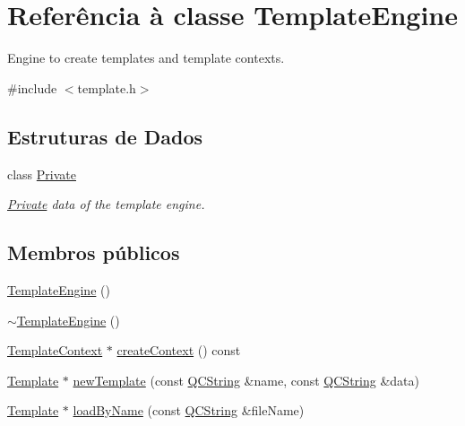 \hypertarget{class_template_engine}{\section{Referência à classe Template\-Engine}
\label{class_template_engine}
}


Engine to create templates and template contexts.  




{\ttfamily \#include $<$template.\-h$>$}

\subsection*{Estruturas de Dados}
\begin{DoxyCompactItemize}
\item 
class \hyperlink{class_template_engine_1_1_private}{Private}
\begin{DoxyCompactList}\small\item\em \hyperlink{class_template_engine_1_1_private}{Private} data of the template engine. \end{DoxyCompactList}\end{DoxyCompactItemize}
\subsection*{Membros públicos}
\begin{DoxyCompactItemize}
\item 
\hyperlink{class_template_engine_af3b5bb1dcf0478beab55466e2c65ca92}{Template\-Engine} ()
\item 
\hyperlink{class_template_engine_a6e95d8f09494c96330e9162a9fbc173d}{$\sim$\-Template\-Engine} ()
\item 
\hyperlink{class_template_context}{Template\-Context} $\ast$ \hyperlink{class_template_engine_a2316f3e9044091aa296f578d7bd07f92}{create\-Context} () const 
\item 
\hyperlink{class_template}{Template} $\ast$ \hyperlink{class_template_engine_af3109721a422c073797a0541a3e3d57a}{new\-Template} (const \hyperlink{class_q_c_string}{Q\-C\-String} \&name, const \hyperlink{class_q_c_string}{Q\-C\-String} \&data)
\item 
\hyperlink{class_template}{Template} $\ast$ \hyperlink{class_template_engine_a2124e90bbdf5e3738289aff07713ebc3}{load\-By\-Name} (const \hyperlink{class_q_c_string}{Q\-C\-String} \&file\-Name)
\end{DoxyCompactItemize}


